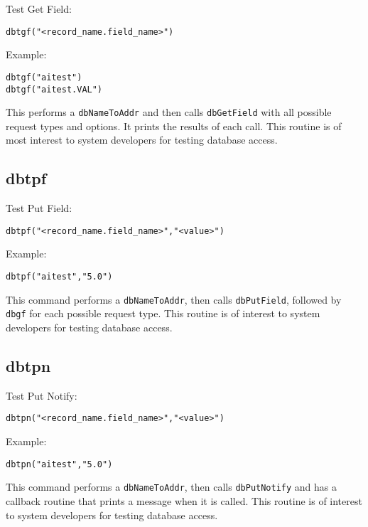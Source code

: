 Test Get Field:

\begin{verbatim}
dbtgf("<record_name.field_name>")
\end{verbatim}

Example:

\begin{verbatim}
dbtgf("aitest")
dbtgf("aitest.VAL")
\end{verbatim}

This performs a \verb|dbNameToAddr| and then calls \verb|dbGetField| with all possible request types and options. It prints the 
results of each call. This routine is of most interest to system developers for testing database access.

\subsection{dbtpf}

Test Put Field:

\begin{verbatim}
dbtpf("<record_name.field_name>","<value>")
\end{verbatim}

Example:

\begin{verbatim}
dbtpf("aitest","5.0")
\end{verbatim}

This command performs a \verb|dbNameToAddr|, then calls \verb|dbPutField|, followed by \verb|dbgf| for each possible request type. 
This routine is of interest to system developers for testing database access.

\subsection{dbtpn}

Test Put Notify:

\begin{verbatim}
dbtpn("<record_name.field_name>","<value>")
\end{verbatim}

Example:

\begin{verbatim}
dbtpn("aitest","5.0")
\end{verbatim}

This command performs a \verb|dbNameToAddr|, then calls \verb|dbPutNotify| and has a callback routine that prints a message 
when it is called. This routine is of interest to system developers for testing database access.

